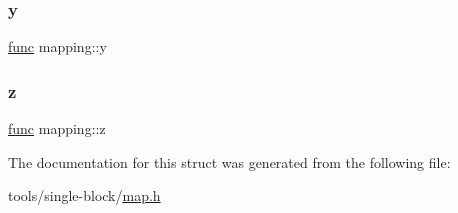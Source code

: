 \mbox{\label{structmapping_ad35765a69218ccf1149aaf7bac65529a}} 
\subsubsection{\texorpdfstring{y}{y}}
{\footnotesize\ttfamily \mbox{\hyperlink{base_8h_a6dd92a1df4b8b4a265cd65db9907ebe5}{func}} mapping\+::y}

\mbox{\label{structmapping_a72e48178353662ca496d1a19779370c5}} 
\subsubsection{\texorpdfstring{z}{z}}
{\footnotesize\ttfamily \mbox{\hyperlink{base_8h_a6dd92a1df4b8b4a265cd65db9907ebe5}{func}} mapping\+::z}



The documentation for this struct was generated from the following file\+:\begin{DoxyCompactItemize}
\item 
tools/single-\/block/\mbox{\hyperlink{map_8h}{map.\+h}}\end{DoxyCompactItemize}
